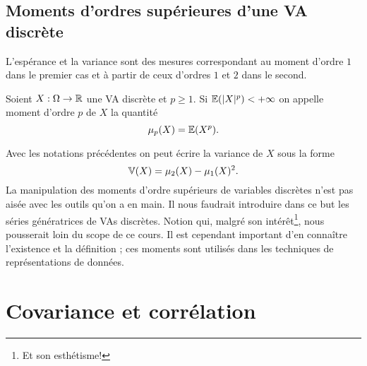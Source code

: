 \documentclass[11pt, a4paper]{article}
\begin{document}
\subsection{Moments d'ordres supérieures d'une VA discrète}
\label{sec:momentsups}

L'espérance et la variance sont des mesures correspondant au moment
d'ordre $1$ dans le premier cas et à partir de ceux d'ordres $1$ et
$2$ dans le second.
\begin{defn}
  Soient $X : \Omega \to \mathbb{R}$ une VA discrète et $p \geq 1$. Si
  $\operatorname{\mathbb{E}}(|X|^p) < +\infty$ on appelle moment d'ordre $p$ de $X$ la
  quantité
  \[
    \mu_p(X) = \operatorname{\mathbb{E}}(X^p).
  \]
\end{defn}
Avec les notations précédentes on peut écrire la variance de $X$ sous
la forme
\[
  \operatorname{\mathbb{V}}(X) = \mu_2(X) - \mu_1(X)^2.
\]
La manipulation des moments d'ordre supérieurs de variables discrètes
n'est pas aisée avec les outils qu'on a en main. Il nous faudrait
introduire dans ce but les séries génératrices de VAs
discrètes. Notion qui, malgré son intérêt\footnote{Et son
  esthétisme!}, nous pousserait loin du scope de ce cours. Il est
cependant important d'en connaître l'existence et la définition ; ces
moments sont utilisés dans les techniques de représentations de
données.

\section{Covariance et corrélation}
\label{sec:convarianceetcorrelation}




\end{document}
